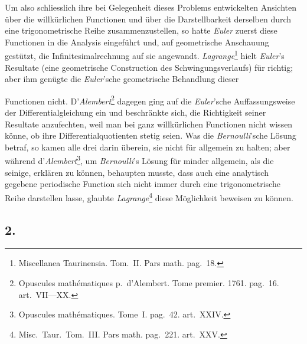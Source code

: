 \documentclass[12pt,a4paper]{article}
\begin{document}
Um also schliesslich ihre bei Gelegenheit dieses Problems entwickelten Ansichten über die willkürlichen Functionen und über die Darstellbarkeit derselben durch eine trigonometrische Reihe zusammenzustellen, so hatte \textit{Euler} zuerst diese Functionen in die Analysis eingeführt und, auf geometrische Anschauung gestützt, die Infinitesimalrechnung auf sie angewandt. \textit{Lagrange}\footnote{Miscellanea Taurinensia. Tom.~II. Pars math. pag.~18.} hielt \textit{Euler}'s Resultate (eine geometrische Construction des Schwingungsverlaufs) für richtig; aber ihm genügte die \textit{Euler}'sche geometrische Behandlung dieser

\newpage

Functionen nicht. D'\textit{Alembert}\footnote{Opuscules mathématiques p.\ d'Alembert. Tome premier. 1761. pag.~16. art.~VII---XX.} dagegen ging auf die \textit{Euler}'sche Auffassungsweise der Differentialgleichung ein und beschränkte sich, die Richtigkeit seiner Resultate anzufechten, weil man bei ganz willkürlichen Functionen nicht wissen könne, ob ihre Differentialquotienten stetig seien. Was die \textit{Bernoulli}'sche Lösung betraf, so kamen alle drei darin überein, sie nicht für allgemein zu halten; aber während d'\textit{Alembert}\footnote{Opuscules mathématiques. Tome~I. pag.~42. art.~XXIV.}, um \textit{Bernoulli}'s Lösung für minder allgemein, als die seinige, erklären zu können, behaupten musste, dass auch eine analytisch gegebene periodische Function sich nicht immer durch eine trigonometrische Reihe darstellen lasse, glaubte \textit{Lagrange}\footnote{Misc.\ Taur.\ Tom.~III. Pars math. pag.~221. art.~XXV.} diese Möglichkeit beweisen zu können.

\subsection*{2.}
\end{document}
